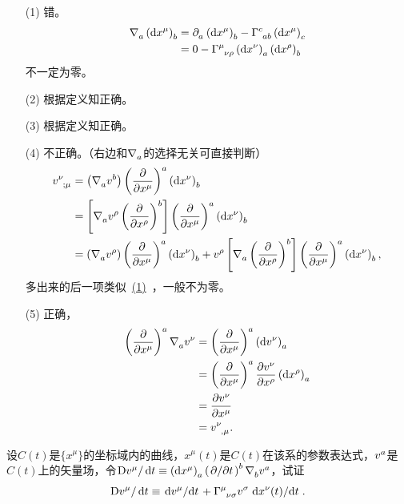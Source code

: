 \begin{xiti}
	\begin{jie}
		\begin{enumerate}
			\item[(1)] 错。
			\begin{align*}
			\Nabla{a} \tensor{\left(\dd{x^\mu}\right)}{_b}&=\Partial{a} \tensor{\left(\dd{x^\mu}\right)}{_b} - \ChristoffelSymbol{c}{a}{b} \tensor{\left(\dd{x^\mu}\right)}{_c}\\
			&=0-\ChristoffelSymbol{\mu}{\nu}{\rho} \tensor{\left(\dd{x^\nu}\right)}{_a} \tensor{\left(\dd{x^\rho}\right)}{_b}
			\end{align*}
			不一定为零。
			\item[(2)] 根据定义知正确。
			\item[(3)] 根据定义知正确。
			\item[(4)] 不正确。（右边和$\Nabla{a}$的选择无关可直接判断）
			\begin{align*}
			\tensor{v}{^\nu_{;\mu}}&= \left(\Nabla{a} \tensor{v}{^b} \right) \tensor{\left(\pdv{x^\mu} \right)}{^a} \tensor{\left(\dd{x^\nu}\right)}{_b}\\
			&= \left[\Nabla{a} \tensor{v}{^\rho} \tensor{\left(\pdv{x^\rho}\right)}{^b} \right] \tensor{\left(\pdv{x^\mu} \right)}{^a} \tensor{\left(\dd{x^\nu}\right)}{_b}\\
			&=\left(\Nabla{a} \tensor{v}{^\rho} \right) \tensor{\left(\pdv{x^\mu} \right)}{^a} \tensor{\left(\dd{x^\nu}\right)}{_b} +\tensor{v}{^\rho} \left[ \Nabla{a} \tensor{\left( \pdv{x^\rho} \right)}{^b} \right] \tensor{\left(\pdv{x^\mu} \right)}{^a} \tensor{\left(\dd{x^\nu}\right)}{_b},
			\end{align*}
			多出来的后一项类似~\hyperlink{3.5.1}{(1)}~，一般不为零。
			\item[(5)] 正确，
			\begin{align*}
			\tensor{\left(\pdv{x^\mu}\right)}{^a} \Nabla{a} \tensor{v}{^\nu}&=\tensor{\left(\pdv{x^\mu}\right)}{^a} \tensor{\left(\dd{v^\nu}\right)}{_a} \\
			&=\tensor{\left(\pdv{x^\mu}\right)}{^a} \pdv{\tensor{v}{^\nu}}{x^\rho} \tensor{\left(\dd{x^\rho}\right)}{_a}\\
			&=\pdv{ \tensor{v}{^\nu}}{x^\mu}\\
			&=\tensor{v}{^\nu_{,\mu}}.
			\end{align*}
		\end{enumerate}
	\end{jie}
	
	\item 设$C(t) $是$\{x^\mu\}$的坐标域内的曲线，$x^\mu (t)$是$C(t)$在该系的参数表达式，$\tensor{v}{^a}$是$C(t)$上的矢量场，令$\mathrm{D}\tensor{v}{^\mu} / \dd{t} \equiv \tensor{\left(\dd{x^\mu}\right)}{_a} \tensor{\left(\pd{t}\right)}{^b} \Nabla{b} \tensor{v}{^a} $，试证
	\begin{displaymath}
	\mathrm{D} \tensor{v}{^\mu} / \dd{t} \equiv \dv*{\tensor{v}{^\mu}}{t} + \ChristoffelSymbol{\mu}{\nu}{\sigma} \tensor{v}{^\sigma} \dv*{x^\nu (t)}{t}.
	\end{displaymath}
	

\end{xiti}
